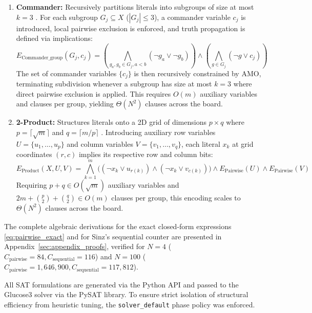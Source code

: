 \begin{enumerate}
\item \textbf{Commander:} Recursively partitions literals into subgroups of size at most $k=3$ \citep{klieber2007solving}. For each subgroup $G_j \subseteq X$ ($|G_j| \le 3$), a commander variable $c_j$ is introduced, local pairwise exclusion is enforced, and truth propagation is defined via implications:
\begin{equation}
E_{\text{Commander\_group}}(G_j, c_j) = \left( \bigwedge_{g_a, g_b \in G_j, a < b} (\neg g_a \lor \neg g_b) \right) \land \left( \bigwedge_{g \in G_j} (\neg g \lor c_j) \right)
\end{equation}
The set of commander variables $\{c_j\}$ is then recursively constrained by AMO, terminating subdivision whenever a subgroup has size at most $k=3$ where direct pairwise exclusion is applied. This requires $O(m)$ auxiliary variables and clauses per group, yielding $\Theta(N^2)$ clauses across the board.

\item \textbf{2-Product:} Structures literals onto a 2D grid of dimensions $p \times q$ where $p = \lceil \sqrt{m} \rceil$ and $q = \lceil m/p \rceil$ \citep{chen2010new}. Introducing auxiliary row variables $U = \{u_1, \dots, u_p\}$ and column variables $V = \{v_1, \dots, v_q\}$, each literal $x_k$ at grid coordinates $(r, c)$ implies its respective row and column bits:
\begin{equation}
E_{\text{Product}}(X, U, V) = \bigwedge_{k=1}^m \Big( (\neg x_k \lor u_{r(k)}) \land (\neg x_k \lor v_{c(k)}) \Big) \land E_{\text{Pairwise}}(U) \land E_{\text{Pairwise}}(V)
\end{equation}
Requiring $p + q \in O(\sqrt{m})$ auxiliary variables and $2m + \binom{p}{2} + \binom{q}{2} \in O(m)$ clauses per group, this encoding scales to $\Theta(N^2)$ clauses across the board.
\end{enumerate}

The complete algebraic derivations for the exact closed-form expressions \eqref{eq:pairwise_exact} and for Sinz's sequential counter are presented in Appendix~\ref{sec:appendix_proofs}, verified for $N=4$ ($C_{\text{pairwise}}=84, C_{\text{sequential}}=116$) and $N=100$ ($C_{\text{pairwise}}=1,646,900, C_{\text{sequential}}=117,812$).

All SAT formulations are generated via the Python API and passed to the Glucose3 solver \citep{audemard2009predicting} via the PySAT library. To ensure strict isolation of structural efficiency from heuristic tuning, the \texttt{solver\_default} phase policy was enforced.

